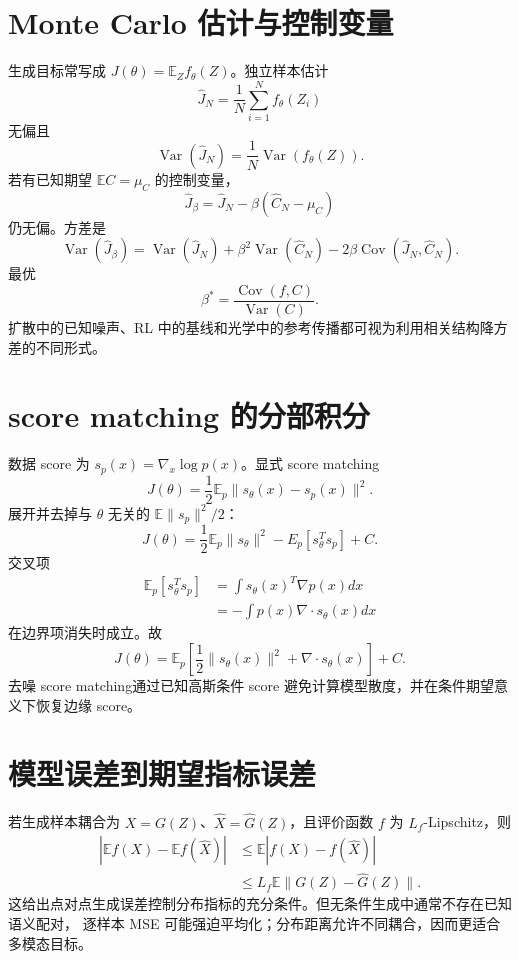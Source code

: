 \documentclass[11pt]{article}
\numberwithin{equation}{section}
\newcommand{\E}{\mathbb{E}}
\newcommand{\1}{\mathbf{1}}
\newcommand{\Var}{\operatorname{Var}}
\newcommand{\Cov}{\operatorname{Cov}}
\begin{document}
\section{Monte Carlo 估计与控制变量}

生成目标常写成 $J(\theta)=\E_Z f_\theta(Z)$。独立样本估计
\begin{equation}
 \widehat J_N=\frac1N\sum_{i=1}^{N}f_\theta(Z_i)
\end{equation}
无偏且
\begin{equation}
 \Var(\widehat J_N)=\frac1N\Var(f_\theta(Z)).
\end{equation}
若有已知期望 $\E C=\mu_C$ 的控制变量，
\begin{equation}
 \widehat J_\beta=\widehat J_N-\beta(\widehat C_N-\mu_C)
\end{equation}
仍无偏。方差是
\begin{equation}
 \Var(\widehat J_\beta)
 =\Var(\widehat J_N)+\beta^2\Var(\widehat C_N)
 -2\beta\Cov(\widehat J_N,\widehat C_N).
\end{equation}
最优
\begin{equation}
 \beta^*=\frac{\Cov(f,C)}{\Var(C)}.
\end{equation}
扩散中的已知噪声、RL 中的基线和光学中的参考传播都可视为利用相关结构降方差的不同形式。

\section{score matching 的分部积分}

数据 score 为 $s_p(x)=\nabla_x\log p(x)$。显式 score matching
\begin{equation}
 J(\theta)=\frac12\E_p\|s_\theta(x)-s_p(x)\|^2.
\end{equation}
展开并去掉与 $\theta$ 无关的 $\E\|s_p\|^2/2$：
\begin{equation}
 J(\theta)=\frac12\E_p\|s_\theta\|^2-E_p[s_\theta^Ts_p]+C.
\end{equation}
交叉项
\begin{align}
 \E_p[s_\theta^Ts_p]
 &=\int s_\theta(x)^T\nabla p(x)dx\\
 &=-\int p(x)\nabla\cdot s_\theta(x)dx
\end{align}
在边界项消失时成立。故
\begin{equation}
 J(\theta)=\E_p\left[
 \frac12\|s_\theta(x)\|^2+\nabla\cdot s_\theta(x)
 \right]+C.
\end{equation}
去噪 score matching通过已知高斯条件 score 避免计算模型散度，并在条件期望意义下恢复边缘 score。

\section{模型误差到期望指标误差}

若生成样本耦合为 $X=G(Z)$、$\widehat X=\widehat G(Z)$，且评价函数
$f$ 为 $L_f$-Lipschitz，则
\begin{align}
 |\E f(X)-\E f(\widehat X)|
 &\le\E|f(X)-f(\widehat X)|\\
 &\le L_f\E\|G(Z)-\widehat G(Z)\|.
\end{align}
这给出点对点生成误差控制分布指标的充分条件。但无条件生成中通常不存在已知语义配对，
逐样本 MSE 可能强迫平均化；分布距离允许不同耦合，因而更适合多模态目标。
\end{document}
